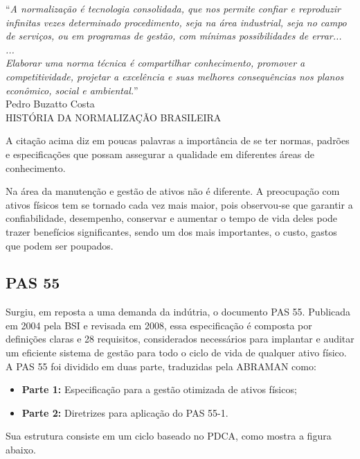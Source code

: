 \begin{flushright}
	“\textit{A normalização é tecnologia consolidada, que nos
permite confiar e reproduzir infinitas vezes determinado
procedimento, seja na área industrial, seja no campo de
serviços, ou em programas de gestão, com mínimas
possibilidades de errar...
\\
...
\\
Elaborar uma norma técnica é compartilhar
conhecimento, promover a competitividade, projetar a
excelência e suas melhores consequências nos planos
econômico, social e ambiental.}”
\\
Pedro Buzatto Costa
\\
HISTÓRIA DA NORMALIZAÇÃO BRASILEIRA
\end{flushright}

A citação acima diz em poucas palavras a importância de se ter normas, padrões e especificações que possam assegurar a qualidade em diferentes áreas de conhecimento.

Na área da manutenção e gestão de ativos não é diferente. A preocupação com ativos físicos tem se tornado cada vez mais maior, pois observou-se que garantir a confiabilidade, desempenho, conservar e aumentar o tempo de vida deles pode trazer benefícios significantes, sendo um dos mais importantes, o custo, gastos que podem ser poupados.

\subsection{PAS 55}

Surgiu, em reposta a uma demanda da indútria, o documento PAS 55. Publicada em 2004 pela BSI e revisada em 2008, essa especificação é composta por definições claras e 28 requisitos, considerados necessários para implantar e auditar um eficiente sistema de gestão para todo o ciclo de vida de qualquer ativo físico. A PAS 55 foi dividido em duas parte, traduzidas pela ABRAMAN como:

\begin{itemize}
	\item \textbf{Parte 1:} Especificação para a gestão otimizada de ativos físicos;
	\item \textbf{Parte 2:} Diretrizes para aplicação do PAS 55-1. 
\end{itemize} 

Sua estrutura consiste em um ciclo baseado no PDCA, como mostra a figura abaixo.

